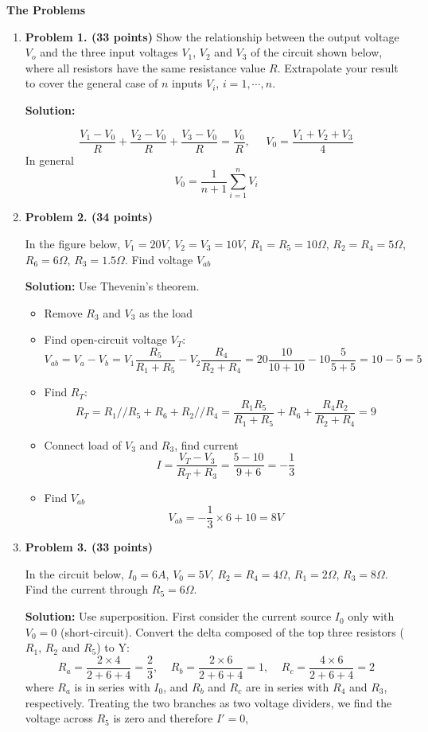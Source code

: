 {\bf The Problems}
\begin{enumerate}

\item {\bf Problem 1. (33 points)} 
Show the relationship between the output voltage $V_o$ and the three input
voltages $V_1$, $V_2$ and $V_3$ of the circuit shown below, where all 
resistors have the same resistance value $R$. Extrapolate your result to 
cover the general case of $n$ inputs $V_i$, $i=1,\cdots,n$.


{\bf Solution:}

\[ \frac{V_1-V_0}{R}+\frac{V_2-V_0}{R}+\frac{V_3-V_0}{R}=\frac{V_0}{R}
,\;\;\;\;\; V_0=\frac{V_1+V_2+V_3}{4}	\]
In general
\[ V_0=\frac{1}{n+1}\sum_{i=1}^n V_i \]

\item {\bf Problem 2. (34 points)} 

In the figure below, $V_1=20V$, $V_2=V_3=10V$, $R_1=R_5=10\Omega$, 
$R_2=R_4=5\Omega$, $R_6=6\Omega$, $R_3=1.5\Omega$. Find voltage $V_{ab}$


{\bf Solution:} Use Thevenin's theorem. 
\begin{itemize}
\item Remove $R_3$ and $V_3$ as the load
\item Find open-circuit voltage $V_T$:
\[	V_{ab}=V_a-V_b=V_1\frac{R_5}{R_1+R_5}-V_2\frac{R_4}{R_2+R_4}
	=20 \frac{10}{10+10}-10 \frac{5}{5+5}=10-5=5 \]
\item Find $R_T$:
\[	R_T=R_1//R_5+R_6+R_2//R_4
	=\frac{R_1R_5}{R_1+R_5}+R_6+\frac{R_4R_2}{R_2+R_4}=9 \]
\item Connect load of $V_3$ and $R_3$, find current
\[	I=\frac{V_T-V_3}{R_T+R_3}=\frac{5-10}{9+6}=-\frac{1}{3} \]
\item Find $V_{ab}$
\[	V_{ab}=-\frac{1}{3}\times 6 +10=8V	\]
\end{itemize}

\item {\bf Problem 3. (33 points)} 

In the circuit below, $I_0=6A$, $V_0=5V$, $R_2=R_4=4\Omega$, $R_1=2\Omega$,
$R_3=8\Omega$. Find the current through $R_5=6\Omega$.


{\bf Solution:} Use superposition. First consider the current source $I_0$ 
only with $V_0=0$ (short-circuit). Convert the delta composed of the top three 
resistors ($R_1$, $R_2$ and $R_5$) to Y:
\[	R_a=\frac{2\times 4}{2+6+4}=\frac{2}{3},\;\;\;\;
	R_b=\frac{2\times 6}{2+6+4}=1,\;\;\;\;R_c=\frac{4\times 6}{2+6+4}=2 \]
where $R_a$ is in series with $I_0$, and $R_b$ and $R_c$ are in series with 
$R_4$ and $R_3$, respectively. Treating the two branches as two voltage dividers,
we find the voltage across $R_5$ is zero and therefore $I'=0$,


\end{enumerate}
